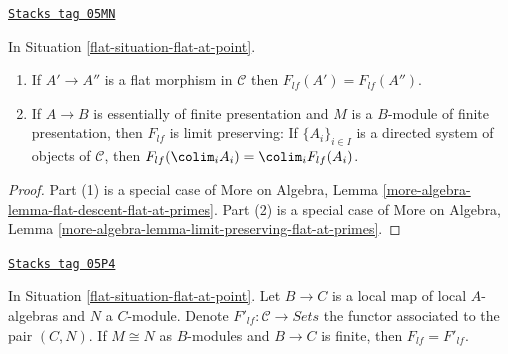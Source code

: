 \begin{lemma}
\label{flat-lemma-flat-at-point}
\href{https://stacks.math.columbia.edu/tag/05MN}{\texttt{Stacks tag 05MN}}

In Situation \ref{flat-situation-flat-at-point}.
\begin{enumerate}
\item If $A' \to A''$ is a flat morphism in $\mathcal{C}$
then $F_{lf}(A') = F_{lf}(A'')$.
\item If $A \to B$ is essentially of finite presentation and
$M$ is a $B$-module of finite presentation, then $F_{lf}$ is limit
preserving: If $\{A_i\}_{i \in I}$ is a
directed system of objects of $\mathcal{C}$, then
$F_{lf}(\colim_i A_i) = \colim_i F_{lf}(A_i)$.
\end{enumerate}
\end{lemma}

\begin{proof}
Part (1) is a special case of
More on Algebra,
Lemma \ref{more-algebra-lemma-flat-descent-flat-at-primes}.
Part (2) is a special case of
More on Algebra,
Lemma \ref{more-algebra-lemma-limit-preserving-flat-at-primes}.
\end{proof}

\begin{lemma}
\label{flat-lemma-flat-at-point-finite}
\href{https://stacks.math.columbia.edu/tag/05P4}{\texttt{Stacks tag 05P4}}

In Situation \ref{flat-situation-flat-at-point}. Let $B \to C$ is a local map of
local $A$-algebras and $N$ a $C$-module. Denote
$F'_{lf} : \mathcal{C} \to \textit{Sets}$ the functor associated to the pair
$(C, N)$. If $M \cong N$ as $B$-modules and $B \to C$ is finite, then
$F_{lf} = F'_{lf}$.
\end{lemma}

